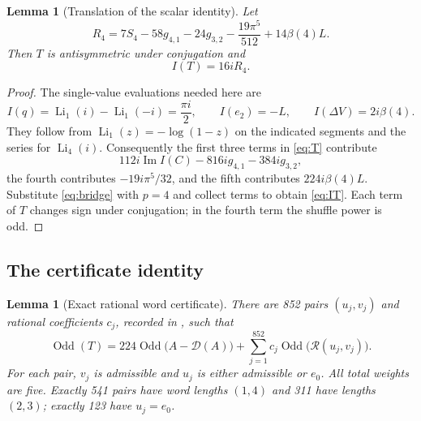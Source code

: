 \documentclass[11pt,letterpaper]{article}
\numberwithin{equation}{section}
\newtheorem{lemma}[theorem]{Lemma}
\theoremstyle{definition}
\DeclareMathOperator{\Li}{Li}
\DeclareMathOperator{\Imag}{Im}
\DeclareMathOperator{\Odd}{Odd}
\newcommand{\cay}{\mathcal D}
\begin{document}
\begin{lemma}[Translation of the scalar identity]\label{lem:T}
Let
\begin{equation}
 R_4=7S_4-58g_{4,1}-24g_{3,2}
      -\frac{19\pi^5}{512}+14\beta(4)L.
 \label{eq:R4}
\end{equation}
Then $T$ is antisymmetric under conjugation and
\begin{equation}
 I(T)=16iR_4.
 \label{eq:IT}
\end{equation}
\end{lemma}
\begin{proof}
The single-value evaluations needed here are
\[
 I(q)=\Li_1(i)-\Li_1(-i)=\frac{\pi i}{2},\qquad
 I(e_2)=-L,\qquad I(\Delta V)=2i\beta(4).
\]
They follow from $\Li_1(z)=-\log(1-z)$ on the indicated segments and
the series for $\Li_4(i)$. Consequently the first three terms in
\eqref{eq:T} contribute
\[
 112i\Imag I(C)-816ig_{4,1}-384ig_{3,2},
\]
the fourth contributes $-19i\pi^5/32$, and the fifth contributes
$224i\beta(4)L$. Substitute \eqref{eq:bridge} with $p=4$ and collect
terms to obtain \eqref{eq:IT}. Each term of $T$ changes sign under
conjugation; in the fourth term the shuffle power is odd.
\end{proof}

\subsection{The certificate identity}
\begin{lemma}[Exact rational word certificate]\label{lem:certificate}
There are 852 pairs $(u_j,v_j)$ and rational coefficients $c_j$, recorded
in , such that
\begin{equation}
 \boxed{\displaystyle
 \Odd(T)=224\Odd\bigl(A-\cay(A)\bigr)
              +\sum_{j=1}^{852}c_j\Odd\bigl(\mathcal R(u_j,v_j)\bigr).}
 \label{eq:certificate}
\end{equation}
For each pair, $v_j$ is admissible and $u_j$ is either admissible or
$e_0$. All total weights are five. Exactly 541 pairs have word lengths
$(1,4)$ and 311 have lengths $(2,3)$; exactly 123 have $u_j=e_0$.
\end{lemma}
\end{document}
